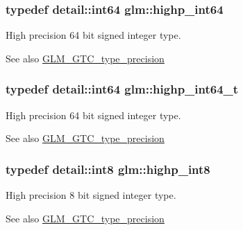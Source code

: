 \subsubsection[{highp\+\_\+int64}]{\setlength{\rightskip}{0pt plus 5cm}typedef detail\+::int64 {\bf glm\+::highp\+\_\+int64}}\label{group__gtc__type__precision_ga7ffb27943e9569800979081bc548621c}
High precision 64 bit signed integer type. \begin{DoxySeeAlso}{See also}
\hyperlink{group__gtc__type__precision}{G\+L\+M\+\_\+\+G\+T\+C\+\_\+type\+\_\+precision} 
\end{DoxySeeAlso}
\hypertarget{group__gtc__type__precision_ga0f5186bde44471133b08057cae8a51ac}{}
\subsubsection[{highp\+\_\+int64\+\_\+t}]{\setlength{\rightskip}{0pt plus 5cm}typedef detail\+::int64 {\bf glm\+::highp\+\_\+int64\+\_\+t}}\label{group__gtc__type__precision_ga0f5186bde44471133b08057cae8a51ac}
High precision 64 bit signed integer type. \begin{DoxySeeAlso}{See also}
\hyperlink{group__gtc__type__precision}{G\+L\+M\+\_\+\+G\+T\+C\+\_\+type\+\_\+precision} 
\end{DoxySeeAlso}
\hypertarget{group__gtc__type__precision_ga57c86999e666760c304453f9bfdc09d1}{}
\subsubsection[{highp\+\_\+int8}]{\setlength{\rightskip}{0pt plus 5cm}typedef detail\+::int8 {\bf glm\+::highp\+\_\+int8}}\label{group__gtc__type__precision_ga57c86999e666760c304453f9bfdc09d1}
High precision 8 bit signed integer type. \begin{DoxySeeAlso}{See also}
\hyperlink{group__gtc__type__precision}{G\+L\+M\+\_\+\+G\+T\+C\+\_\+type\+\_\+precision} 
\end{DoxySeeAlso}
\hypertarget{group__gtc__type__precision_ga417701b99e6e7992f35ab2ef694f88b2}{}
